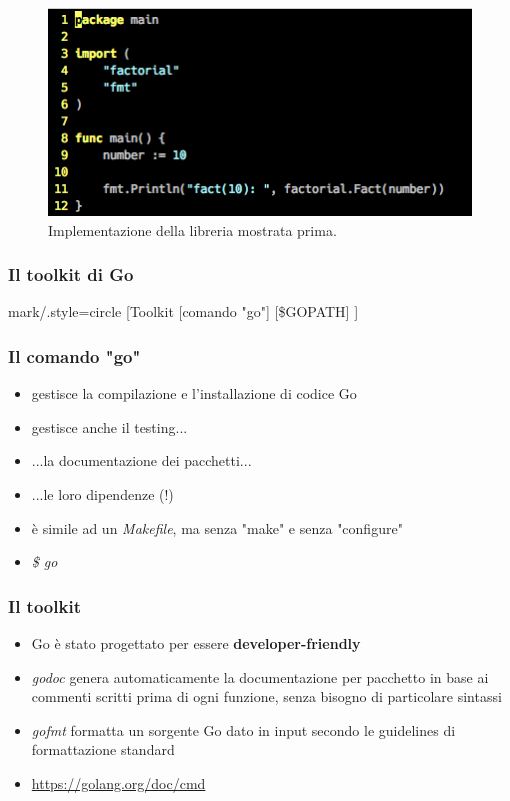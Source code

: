 \documentclass[12pt]{beamer}
\begin{document}
	\begin{frame}
		\begin{figure}
			\centering
			\includegraphics[width=0.7\linewidth]{factmain}
			\caption[Calcolo fattoriale]{Implementazione della libreria mostrata prima.}
			\label{fig:Schermata2015-10-23alle01}
		\end{figure}
	\end{frame}
	
	\begin{frame}
		\frametitle{Il toolkit di Go}
		\centering
		\begin{forest} mark/.style={circle}
			[Toolkit
				[comando "go"]
				[\$GOPATH]
			]
		\end{forest}
	\end{frame}
	
	\begin{frame}
		\frametitle{Il comando "go"}
		\begin{itemize}[<+->]
			\item  gestisce la compilazione e l'installazione di codice Go
			\item gestisce anche il testing...
			\item ...la documentazione dei pacchetti...
			\item ...le loro dipendenze (!)
			\item è simile ad un \textit{Makefile}, ma senza "make" e senza "configure"
			\item \textit{\$ go}
		\end{itemize}
	\end{frame}
	
	\begin{frame}
		\frametitle{Il toolkit}
		\begin{itemize}[<+->]
			\item Go è stato progettato per essere \textbf{developer-friendly}
			\item \textit{godoc} genera automaticamente la documentazione per pacchetto in base ai commenti scritti prima di ogni funzione, senza bisogno di particolare sintassi
			\item \textit{gofmt} formatta un sorgente Go dato in input secondo le guidelines di formattazione standard
			\item \url{https://golang.org/doc/cmd}
		\end{itemize}
	\end{frame}
	
\end{document}
